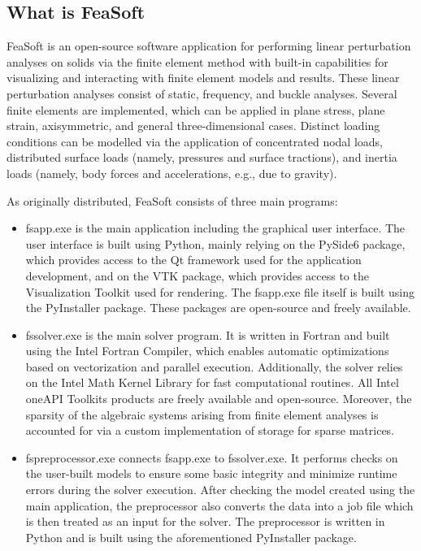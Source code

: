 \documentclass[
    11pt,        %
    a4paper,     %
    final,       %
    fleqn,       %
    notitlepage, %
    onecolumn,   %
    oneside,     %
]{article}
\begin{document}
\subsection{What is FeaSoft}

FeaSoft is an open-source software application for performing linear perturbation analyses on solids via the finite element method with built-in capabilities for visualizing and interacting with finite element models and results. These linear perturbation analyses consist of static, frequency, and buckle analyses. Several finite elements are implemented, which can be applied in plane stress, plane strain, axisymmetric, and general three-dimensional cases. Distinct loading conditions can be modelled via the application of concentrated nodal loads, distributed surface loads (namely, pressures and surface tractions), and inertia loads (namely, body forces and accelerations, e.g., due to gravity).

As originally distributed, FeaSoft consists of three main programs:
\begin{itemize}
    \item fs\textunderscore app.exe is the main application including the graphical user interface. The user interface is built using Python, mainly relying on the PySide6 package, which provides access to the Qt framework used for the application development, and on the VTK package, which provides access to the Visualization Toolkit used for rendering. The fs\textunderscore app.exe file itself is built using the PyInstaller package. These packages are open-source and freely available.
    \item fs\textunderscore solver.exe is the main solver program. It is written in Fortran and built using the Intel Fortran Compiler, which enables automatic optimizations based on vectorization and parallel execution. Additionally, the solver relies on the Intel Math Kernel Library for fast computational routines. All Intel oneAPI Toolkits products are freely available and open-source. Moreover, the sparsity of the algebraic systems arising from finite element analyses is accounted for via a custom implementation of storage for sparse matrices.
    \item fs\textunderscore preprocessor.exe connects fs\textunderscore app.exe to fs\textunderscore solver.exe. It performs checks on the user-built models to ensure some basic integrity and minimize runtime errors during the solver execution. After checking the model created using the main application, the preprocessor also converts the data into a job file which is then treated as an input for the solver. The preprocessor is written in Python and is built using the aforementioned PyInstaller package.
\end{itemize}
\end{document}
